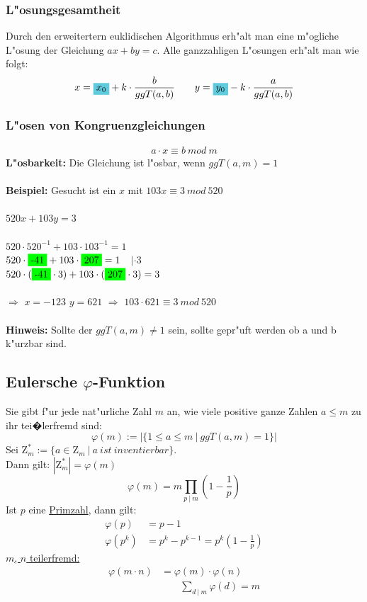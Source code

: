\documentclass[10pt,a4paper,landscape]{article}
\begin{document}
\begin{multicols*}{3}
		\subsubsection{L"osungsgesamtheit}
		Durch den erweitertern euklidischen Algorithmus erh"alt man eine m"ogliche L"osung der Gleichung $ax + by = c$. Alle ganzzahligen L"osungen erh"alt man wie folgt:
		\[ x = \colorbox{SkyBlue}{$x_0$} + k \cdot \frac{b}{ggT(a,b)}~~~~~~y = \colorbox{SkyBlue}{$y_0$} - k \cdot \frac{a}{ggT(a,b)} \]
		
		\subsubsection{L"osen von Kongruenzgleichungen}
		\begin{align*}
		a \cdot x \equiv b~mod~m 
		\end{align*}
		\textbf{L"osbarkeit:} Die Gleichung ist l"osbar, wenn $ggT(a, m) = 1$\\
		\\
		\textbf{Beispiel:} Gesucht ist ein $x$ mit $103x \equiv 3~mod~520$\\
		\\
		$520x + 103y = 3$\\
		\\
		$520 \cdot 520^{-1} + 103 \cdot 103^{-1} = 1$\\
		$520 \cdot \colorbox{green}{-41} + 103 \cdot \colorbox{green}{207} = 1$$\quad$$| \cdot 3$\\
		$520 \cdot (\colorbox{green}{-41} \cdot 3) + 103 \cdot (\colorbox{green}{207} \cdot 3) = 3$\\
		\\
		$\Rightarrow$ $x=-123$ $y=621$ $\Rightarrow$ $103 \cdot 621 \equiv 3~mod~520$\\
		\\
		\textbf{Hinweis:} Sollte der $ggT(a, m) \neq 1$ sein, sollte gepr"uft werden ob a und b k"urzbar sind.
		
		\subsection{Eulersche $\varphi$-Funktion}
		Sie gibt f"ur jede nat"urliche Zahl $m$ an, wie viele positive ganze Zahlen $a \leq m$ zu ihr tei�lerfremd sind: 
		\[
		\varphi(m) := |\{1 \leq a \leq m~|~ggT(a, m) = 1\}|
		\]
		Sei $\mathrm{Z}^*_m := \{a \in \mathrm{Z}_m~|~a~ist~inventierbar\}$.\\
		Dann gilt: $|\mathrm{Z}^*_m| = \varphi(m) $
		\[
		\varphi(m) = m \prod_{p~|~m}^{} (1 - \frac{1}{p})
		\]
		Ist $p$ eine \uline{Primzahl}, dann gilt:
		\begin{align*}
		\varphi(p)   & = p - 1                                 \\
		\varphi(p^k) & = p^k - p^{k-1} = p^k (1 - \frac{1}{p}) 
		\end{align*}
		\uline{$m$, $n$ teilerfremd:}
		\begin{align*}
		\varphi(m \cdot n) & = \varphi(m) \cdot \varphi(n)                \\
		& \phantom{b=\,}\sum_{d~|~m}^{} \varphi(d) = m 
		\end{align*}
		

\end{multicols*}
\end{document}
